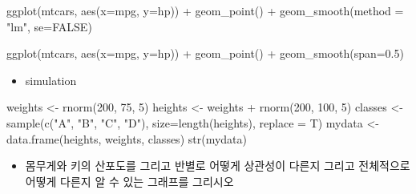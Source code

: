 \documentclass[
]{book}
\newenvironment{Shaded}{\begin{snugshade}}{\end{snugshade}}
\newcommand{\AttributeTok}[1]{\textcolor[rgb]{0.77,0.63,0.00}{#1}}
\newcommand{\ConstantTok}[1]{\textcolor[rgb]{0.00,0.00,0.00}{#1}}
\newcommand{\DecValTok}[1]{\textcolor[rgb]{0.00,0.00,0.81}{#1}}
\newcommand{\FloatTok}[1]{\textcolor[rgb]{0.00,0.00,0.81}{#1}}
\newcommand{\FunctionTok}[1]{\textcolor[rgb]{0.00,0.00,0.00}{#1}}
\newcommand{\NormalTok}[1]{#1}
\newcommand{\OtherTok}[1]{\textcolor[rgb]{0.56,0.35,0.01}{#1}}
\newcommand{\SpecialCharTok}[1]{\textcolor[rgb]{0.00,0.00,0.00}{#1}}
\newcommand{\StringTok}[1]{\textcolor[rgb]{0.31,0.60,0.02}{#1}}
\providecommand{\tightlist}{%
  \setlength{\itemsep}{0pt}\setlength{\parskip}{0pt}}
\begin{document}
\begin{Shaded}
\begin{Highlighting}[]
\FunctionTok{ggplot}\NormalTok{(mtcars, }\FunctionTok{aes}\NormalTok{(}\AttributeTok{x=}\NormalTok{mpg, }\AttributeTok{y=}\NormalTok{hp)) }\SpecialCharTok{+}
  \FunctionTok{geom\_point}\NormalTok{() }\SpecialCharTok{+}
  \FunctionTok{geom\_smooth}\NormalTok{(}\AttributeTok{method =} \StringTok{"lm"}\NormalTok{, }\AttributeTok{se=}\ConstantTok{FALSE}\NormalTok{)}

\FunctionTok{ggplot}\NormalTok{(mtcars, }\FunctionTok{aes}\NormalTok{(}\AttributeTok{x=}\NormalTok{mpg, }\AttributeTok{y=}\NormalTok{hp)) }\SpecialCharTok{+}
  \FunctionTok{geom\_point}\NormalTok{() }\SpecialCharTok{+}
  \FunctionTok{geom\_smooth}\NormalTok{(}\AttributeTok{span=}\FloatTok{0.5}\NormalTok{)}
\end{Highlighting}
\end{Shaded}

\begin{itemize}
\tightlist
\item
  simulation
\end{itemize}

\begin{Shaded}
\begin{Highlighting}[]

\NormalTok{weights }\OtherTok{\textless{}{-}} \FunctionTok{rnorm}\NormalTok{(}\DecValTok{200}\NormalTok{, }\DecValTok{75}\NormalTok{, }\DecValTok{5}\NormalTok{)}
\NormalTok{heights }\OtherTok{\textless{}{-}}\NormalTok{ weights }\SpecialCharTok{+} \FunctionTok{rnorm}\NormalTok{(}\DecValTok{200}\NormalTok{, }\DecValTok{100}\NormalTok{, }\DecValTok{5}\NormalTok{)}
\NormalTok{classes }\OtherTok{\textless{}{-}} \FunctionTok{sample}\NormalTok{(}\FunctionTok{c}\NormalTok{(}\StringTok{"A"}\NormalTok{, }\StringTok{"B"}\NormalTok{, }\StringTok{"C"}\NormalTok{, }\StringTok{"D"}\NormalTok{), }\AttributeTok{size=}\FunctionTok{length}\NormalTok{(heights), }\AttributeTok{replace =}\NormalTok{ T)}
\NormalTok{mydata }\OtherTok{\textless{}{-}} \FunctionTok{data.frame}\NormalTok{(heights, weights, classes)}
\FunctionTok{str}\NormalTok{(mydata)}
\end{Highlighting}
\end{Shaded}

\begin{itemize}
\tightlist
\item
  몸무게와 키의 산포도를 그리고 반별로 어떻게 상관성이 다른지 그리고 전체적으로 어떻게 다른지 알 수 있는 그래프를 그리시오
\end{itemize}
\end{document}
